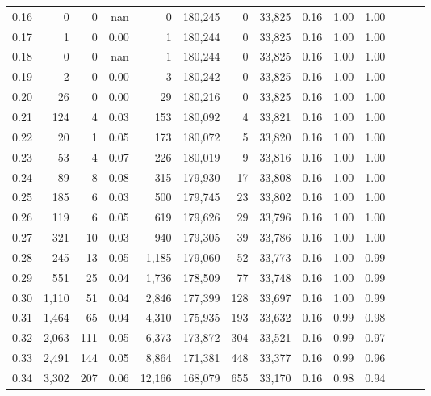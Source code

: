 \begin{tabular}{rrrrrrrrrrrrrr}
0.16 &      0 &      0 &   nan &        0 &  180,245 &       0 &  33,825 &  0.16 &  1.00 &      1.00 \\
0.17 &      1 &      0 &  0.00 &        1 &  180,244 &       0 &  33,825 &  0.16 &  1.00 &      1.00 \\
0.18 &      0 &      0 &   nan &        1 &  180,244 &       0 &  33,825 &  0.16 &  1.00 &      1.00 \\
0.19 &      2 &      0 &  0.00 &        3 &  180,242 &       0 &  33,825 &  0.16 &  1.00 &      1.00 \\
0.20 &     26 &      0 &  0.00 &       29 &  180,216 &       0 &  33,825 &  0.16 &  1.00 &      1.00 \\
0.21 &    124 &      4 &  0.03 &      153 &  180,092 &       4 &  33,821 &  0.16 &  1.00 &      1.00 \\
0.22 &     20 &      1 &  0.05 &      173 &  180,072 &       5 &  33,820 &  0.16 &  1.00 &      1.00 \\
0.23 &     53 &      4 &  0.07 &      226 &  180,019 &       9 &  33,816 &  0.16 &  1.00 &      1.00 \\
0.24 &     89 &      8 &  0.08 &      315 &  179,930 &      17 &  33,808 &  0.16 &  1.00 &      1.00 \\
0.25 &    185 &      6 &  0.03 &      500 &  179,745 &      23 &  33,802 &  0.16 &  1.00 &      1.00 \\
0.26 &    119 &      6 &  0.05 &      619 &  179,626 &      29 &  33,796 &  0.16 &  1.00 &      1.00 \\
0.27 &    321 &     10 &  0.03 &      940 &  179,305 &      39 &  33,786 &  0.16 &  1.00 &      1.00 \\
0.28 &    245 &     13 &  0.05 &    1,185 &  179,060 &      52 &  33,773 &  0.16 &  1.00 &      0.99 \\
0.29 &    551 &     25 &  0.04 &    1,736 &  178,509 &      77 &  33,748 &  0.16 &  1.00 &      0.99 \\
0.30 &  1,110 &     51 &  0.04 &    2,846 &  177,399 &     128 &  33,697 &  0.16 &  1.00 &      0.99 \\
0.31 &  1,464 &     65 &  0.04 &    4,310 &  175,935 &     193 &  33,632 &  0.16 &  0.99 &      0.98 \\
0.32 &  2,063 &    111 &  0.05 &    6,373 &  173,872 &     304 &  33,521 &  0.16 &  0.99 &      0.97 \\
0.33 &  2,491 &    144 &  0.05 &    8,864 &  171,381 &     448 &  33,377 &  0.16 &  0.99 &      0.96 \\
0.34 &  3,302 &    207 &  0.06 &   12,166 &  168,079 &     655 &  33,170 &  0.16 &  0.98 &      0.94 \\

\end{tabular}
